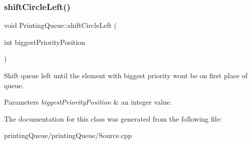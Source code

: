 \subsubsection{\texorpdfstring{shift\+Circle\+Left()}{shiftCircleLeft()}}
{\footnotesize\ttfamily void Printing\+Queue\+::shift\+Circle\+Left (\begin{DoxyParamCaption}\item[{int}]{biggest\+Priority\+Position }\end{DoxyParamCaption})}

Shift queue left until the element with biggest priority won\textquotesingle{}t be on first place of queue.


\begin{DoxyParams}{Parameters}
{\em biggest\+Priority\+Position} & an integer value. \\
\hline
\end{DoxyParams}


The documentation for this class was generated from the following file\+:\begin{DoxyCompactItemize}
\item 
printing\+Queue/printing\+Queue/Source.\+cpp\end{DoxyCompactItemize}
